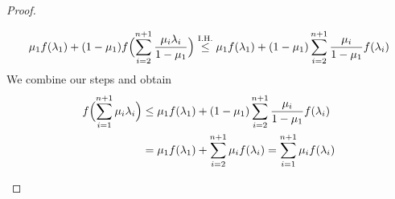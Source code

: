 \documentclass[hidelinks]{article}
\theoremstyle{plain}
\theoremstyle{definition}
\theoremstyle{rem}
\begin{document}
\begin{proof}
\begin{itemize}
\begin{itemize}
\begin{equation*}
		\mu_1f(\lambda_1)+(1-\mu_1)f\Bigl(\sum\limits_{i=2}^{n+1}\frac{\mu_i\lambda_i}{1-\mu_1}\Bigr)\stackrel{\text{I.H.}}{\le} \mu_1f(\lambda_1)+(1-\mu_1)\sum\limits_{i=2}^{n+1}\frac{\mu_i}{1-\mu_1}f(\lambda_i)
	\end{equation*}
	We combine our steps and obtain
	\begin{align*}
		f\Bigl(\sum\limits_{i=1}^{n+1}\mu_i\lambda_i\Bigr)&\le \mu_1f(\lambda_1)+(1-\mu_1)\sum\limits_{i=2}^{n+1}\frac{\mu_i}{1-\mu_1}f(\lambda_i)\\
		&=\mu_1f(\lambda_1)+\sum\limits_{i=2}^{n+1}\mu_if(\lambda_i)=\sum_{i=1}^{n+1} \mu_i f(\lambda_i)\qedhere
	\end{align*}
\end{itemize}
\end{itemize}
\end{proof}
\end{document}
